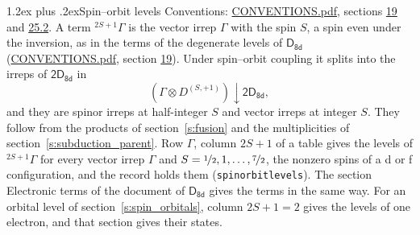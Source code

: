 \documentclass[10pt,a4paper]{article}
\makeatletter
\renewcommand\section{\@startsection{section}{1}{\z@}{-3ex plus -1ex minus -.2ex}%
  {1.2ex plus .2ex}{\normalfont\large\sffamily\bfseries\color{parttitle}}}
\numberwithin{equation}{section}
\newcommand{\grp}[1]{\mathsf{#1}}
\newcommand{\restr}[2]{#1\!\downarrow#2}
\newcommand{\irrJp}[2]{D^{(#1,#2)}}
\newcommand{\irrprod}{\otimes}
\newcommand{\term}[2]{{}^{#1}#2}
\makeatother
\begin{document}
\section{Spin--orbit levels}\label{s:spin_orbit}
Conventions: \href{../../CONVENTIONS.pdf}{CONVENTIONS.pdf}, sections \href{../../../rotation/CONVENTIONS.pdf\#conv.19}{19} and \href{../../CONVENTIONS.pdf\#conv.25.2}{25.2}.
\leavevmode\label{n:local.spin}\label{n:symbol.term}A term $\term{2S+1}{\Gamma}$ is the vector irrep $\Gamma$ with the spin $S$, a spin even under the inversion, as in the terms of the degenerate levels of \href{../../../rotation/data/pdf/D8d.pdf}{$\grp{D_{8d}}$} (\href{../../CONVENTIONS.pdf}{CONVENTIONS.pdf}, section \href{../../../rotation/CONVENTIONS.pdf\#conv.19}{19}). Under spin--orbit coupling it splits into the irreps of $\grp{2D_{8d}}$ in
\begin{equation}\label{e:spinorbit}\restr{(\Gamma \irrprod \irrJp{S}{+1})}{\grp{2D_{8d}}},\end{equation}
and they are spinor irreps at half-integer $S$ and vector irreps at integer $S$. They follow from the products of section~\ref{s:fusion} and the multiplicities of section~\ref{s:subduction_parent}. Row $\Gamma$, column $2S + 1$ of a table gives the levels of $\term{2S+1}{\Gamma}$ for every vector irrep $\Gamma$ and $S = \nicefrac{1}{2}, 1, \dots, \nicefrac{7}{2}$, the nonzero spins of a d or f configuration, and the record holds them (\texttt{spinorbitlevels}). The section Electronic terms of the document of \href{../../../rotation/data/pdf/D8d.pdf}{$\grp{D_{8d}}$} gives the terms in the same way. For an orbital level of section~\ref{s:spin_orbitals}, column $2S + 1 = 2$ gives the levels of one electron, and that section gives their states.
\end{document}
